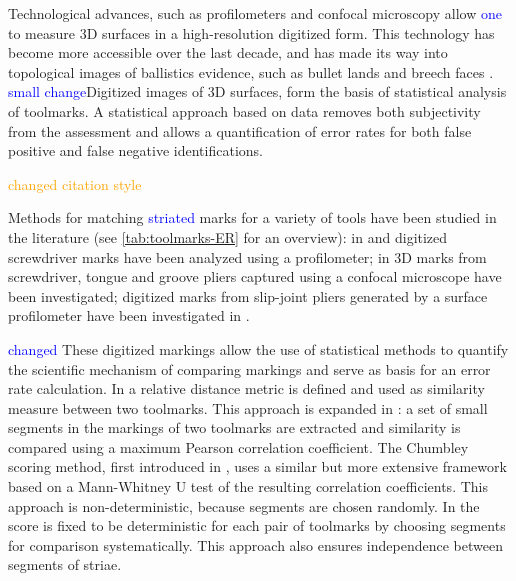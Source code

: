 \documentclass[12pt]{article}
\begin{document}
Technological advances, such as profilometers and confocal microscopy
allow {\textcolor{blue}{one}} to measure 3D surfaces in a
high-resolution digitized form. This technology has become more
accessible over the last decade, and has made its way into topological
images of ballistics evidence, such as bullet lands and breech faces
\cite{DeKinder1, DeKinder2, Bachrach1, vorburger2016}.
{\textcolor{blue}{small change}}Digitized images of 3D surfaces, form
the basis of statistical analysis of toolmarks. A statistical approach
based on data removes both subjectivity from the assessment and allows a
quantification of error rates for both false positive and false negative
identifications.

{\textcolor{orange}{changed citation style}}

Methods for matching {\textcolor{blue}{striated}} marks for a variety of
tools have been studied in the literature (see
\autoref{tab:toolmarks-ER} for an overview): in \cite{manytoolmarks1}
and \cite{chumbley} digitized screwdriver marks have been analyzed using
a profilometer; in \cite{manytoolmarks2} 3D marks from screwdriver,
tongue and groove pliers captured using a confocal microscope have been
investigated; digitized marks from slip-joint pliers generated by a
surface profilometer have been investigated in \cite{afte-chumbley}.

{\textcolor{blue}{changed}} These digitized markings allow the use of
statistical methods to quantify the scientific mechanism of comparing
markings and serve as basis for an error rate calculation. In
\cite{manytoolmarks2} a relative distance metric is defined and used as
similarity measure between two toolmarks. This approach is expanded in
\citet{manytoolmarks1}: a set of small segments in the markings of two
toolmarks are extracted and similarity is compared using a maximum
Pearson correlation coefficient. The Chumbley scoring method, first
introduced in \cite{chumbley}, uses a similar but more extensive
framework based on a Mann-Whitney U test of the resulting correlation
coefficients. This approach is non-deterministic, because segments are
chosen randomly. In \cite{hadler} the score is fixed to be deterministic
for each pair of toolmarks by choosing segments for comparison
systematically. This approach also ensures independence between segments
of striae.
\end{document}

